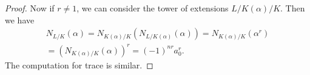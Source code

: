 \documentclass[a4paper]{article}
\begin{document}
\begin{proof}
  Now if $r \not= 1$, we can consider the tower of extensions $L/K(\alpha)/K$. Then we have
  \begin{multline*}
    N_{L/K}(\alpha) = N_{K(\alpha)/K} (N_{L/K(\alpha)}(\alpha)) = N_{K(\alpha)/K}(\alpha^r) \\
    = (N_{K(\alpha)/K} (\alpha))^r = (-1)^{nr} a_0^r.
  \end{multline*}
  The computation for trace is similar.
%

\end{proof}
\end{document}
